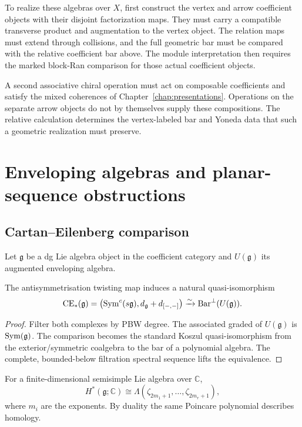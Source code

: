 To realize these algebras over $X$, first construct the vertex and arrow coefficient objects with their disjoint factorization maps.
They must carry a compatible transverse product and augmentation to the vertex object.
The relation maps must extend through collisions, and the full geometric bar must be compared with the relative coefficient bar above.
The module interpretation then requires the marked block-Ran comparison for those actual coefficient objects.

A second associative chiral operation must act on composable coefficients and satisfy the mixed coherences of Chapter~\ref{chap:presentations}.
Operations on the separate arrow objects do not by themselves supply these compositions.
The relative calculation determines the vertex-labeled bar and Yoneda data that such a geometric realization must preserve.

\chapter{Enveloping algebras and planar-sequence obstructions}\label{chap:enveloping}

\section{Cartan--Eilenberg comparison}
Let \(\mathfrak g\) be a dg Lie algebra object in the coefficient category and \(U(\mathfrak g)\) its augmented enveloping algebra.

\begin{theorem}\label{thm:enveloping-bar}
The antisymmetrisation twisting map induces a natural quasi-isomorphism
\[
 \operatorname{CE}_*(\mathfrak g)
 =\bigl(\operatorname{Sym}^c(s\mathfrak g),d_{\mathfrak g}+d_{[-,-]}\bigr)
 \xrightarrow{\sim}
 \operatorname{Bar}^\perp(U(\mathfrak g)).
\]
\end{theorem}
\begin{proof}
Filter both complexes by PBW degree.  The associated graded of \(U(\mathfrak g)\) is \(\operatorname{Sym}(\mathfrak g)\).  The comparison becomes the standard Koszul quasi-isomorphism from the exterior/symmetric coalgebra to the bar of a polynomial algebra.  The complete, bounded-below filtration spectral sequence lifts the equivalence.
\end{proof}

For a finite-dimensional semisimple Lie algebra over \(\mathbb C\),
\[
 H^*(\mathfrak g;\mathbb C)
 \cong\Lambda(\zeta_{2m_1+1},\ldots,\zeta_{2m_r+1}),
\]
where \(m_i\) are the exponents.  By duality the same Poincare polynomial describes homology.

